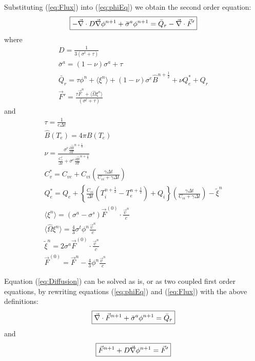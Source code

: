 \documentclass[12pt]{article}
\newcommand{\dt}{\ensuremath{\Delta t}}
\newcommand{\cviOdt}{\ensuremath{\frac{C_{vi}}{\dt}}}
\newcommand{\Cvs}{\ensuremath{C_{v}^{*}}}
\newcommand{\Bnphlf}{\ensuremath{\hat{B}^{n+\frac{1}{2}}}}
\newcommand{\pBnphlfdT}{\ensuremath{\frac{\partial\hat{B}}{\partial T}^{n+\frac{1}{2}}}}
\begin{document}
Substituting (\ref{eq:Flux}) into (\ref{eq:phiEq}) we obtain
the second order equation:
\begin{equation}
   \boxed{
         - \vec{\nabla} \cdot D \vec{\nabla} \phi^{n+1} +  \bar{\sigma}^{a} \phi^{n+1}
                = \bar{Q}_{r} - \vec{\nabla} \cdot \vec{F}'
         }
\label{eq:Diffusion}
\end{equation}
where
\begin{gather}
        D = \frac{1}{3(\sigma^{t} + \tau) } 
  \label{eq:quant_i}
  \\
        \bar{\sigma}^{a} = (1 - \nu) \sigma^{a} + \tau 
  \\
        \bar{Q}_{r} =\tau \phi^{n}
                + \langle \xi^{n} \rangle
                + (1 - \nu) \sigma^{e} \Bnphlf  + \nu Q_{e}^{*} + Q_{r}
  \\
        \vec{F}' = \frac{\tau \vec{F}^{n}
                        + \langle \hat{\Omega} \xi^{n} \rangle}
               {(\sigma^{t} + \tau)}
\end{gather}
and
\begin{gather}
        \tau = \frac{1}{c\dt}
  \\
        \hat{B}(T_{e}) = 4\pi B(T_{e})
  \\
        \nu = \frac{\sigma^{e} \pBnphlfdT } {\frac{\Cvs}{\dt} + \sigma^{e}\pBnphlfdT}
  \\
        \Cvs = C_{ve} + C_{vi} \left(\frac{\gamma\dt}{C_{vi}+\gamma\dt}\right)
  \\
        Q_{e}^{*} = Q_{e} + \left\{ \cviOdt (T_{i}^{n+\frac{1}{2}} - T_{e}^{n+\frac{1}{2}}) +
                                Q_{i} \right\}
                \left(\frac{\gamma\dt}{C_{vi}+\gamma\dt}\right) -
                \tilde{\xi}^{n}
  \\
        \langle \xi^{n} \rangle =
                        (\sigma^{a} - \sigma^{s}) \vec{F}^{(0)}
                        \cdot \frac{\vec{v}^{n}}{c}
  \\
        \langle \hat{\Omega} \xi^{n} \rangle =
                \frac{4}{3} \sigma^{t} \phi^{n} \frac{\vec{v}^{n}}{c}
  \\
        \tilde{\xi}^{n} = 2 \sigma^{a} \vec{F}^{(0)} \cdot
                                \frac{\vec{v}^{n}}{c}
  \\
        \vec{F}^{(0)} = \vec{F}^{n} - \frac{4}{3} \phi^{n}
                                                \frac{\vec{v}^{n}}{c}
  \label{eq:quant_f}
\end{gather}

Equation (\ref{eq:Diffusion}) can be solved as is,
or as two coupled first order equations,
by rewriting equations (\ref{eq:phiEq}) and (\ref{eq:Flux}) with the above
definitions:
\begin{equation}
   \boxed{
        \vec{\nabla} \cdot \vec{F}^{n+1} + \bar{\sigma}^{a} \phi^{n+1}
                = \bar{Q}_{r}
         }
\label{eq:phi2}
\end{equation}
and
\begin{equation}
   \boxed{
        \vec{F}^{n+1} + D \vec{\nabla} \phi^{n+1} =  \vec{F}'
         }
\label{eq:Flux2}
\end{equation}
\end{document}
